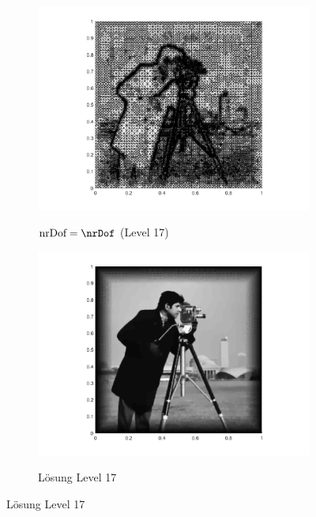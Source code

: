 \begin{figure}[p]
  \centering
  \begin{subfigure}[b]{.48\linewidth}
    \centering
    \caption{$\text{nrDof} = \nrDof$ (Level 17)}
    \includegraphics[trim = 100 30 80 20, clip, width=\linewidth]
      {pictures/chapExperiments/secGrayscale/cam/adaptive/lvl17/triangulation.png}
    \label{fig:camLvl17Triang}
  \end{subfigure}
  \quad
  \begin{subfigure}[b]{.48\linewidth}
    \centering
    \caption{Lösung Level 17}
    \includegraphics[trim = 100 30 80 20, clip, width=\linewidth]
      {pictures/chapExperiments/secGrayscale/cam/adaptive/lvl17/solutionGrayscale.png}
    \label{fig:camLvl17Sol}
  \end{subfigure}


\end{figure}
